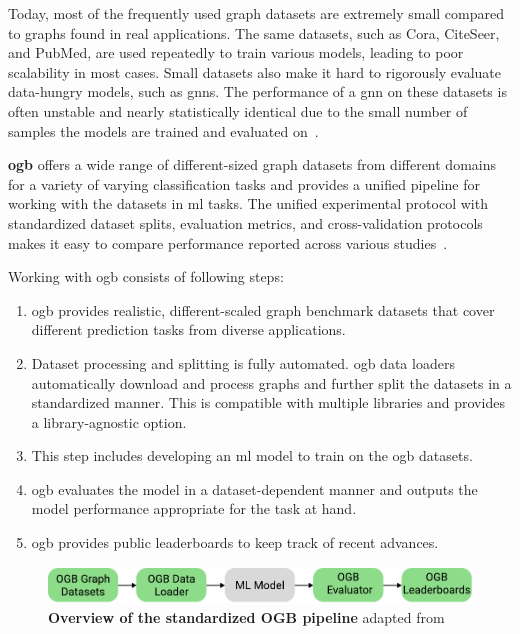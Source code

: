 Today, most of the frequently used graph datasets are extremely small compared to graphs found in real applications.
The same datasets, such as Cora, CiteSeer, and PubMed, are used repeatedly to train various models, leading to poor scalability in most cases. Small datasets also make it hard to rigorously evaluate data-hungry models, such as \acfp{gnn}.
The performance of a \ac{gnn} on these datasets is often unstable and nearly statistically identical due to the small number of samples the models are trained and evaluated on~\cite{Kipf2017,Xu2019, Hu2020}.

\textbf{\Ac{ogb}} offers a wide range of different-sized graph datasets from different domains for a variety of varying classification tasks and provides a unified pipeline for working with the datasets in \ac{ml} tasks.
The unified experimental protocol with standardized dataset splits, evaluation metrics, and cross-validation protocols makes it easy to compare performance reported across various studies~\cite{Hu2020}.

Working with \ac{ogb} consists of following steps:

\begin{enumerate}
    \item \Ac{ogb} provides realistic, different-scaled graph benchmark datasets that cover different prediction tasks from diverse applications.
    \item Dataset processing and splitting is fully automated. \Ac{ogb} data loaders automatically download and process graphs and further split the datasets in a standardized manner.
          This is compatible with multiple libraries and provides a library-agnostic option.
    \item This step includes developing an \ac{ml} model to train on the \ac{ogb} datasets.
    \item  \Ac{ogb} evaluates the model in a dataset-dependent manner and outputs the model performance appropriate for the task at hand.
    \item \Ac{ogb} provides public leaderboards to keep track of recent advances.
\end{enumerate}

\begin{figure}[H]
    \centering
    \includegraphics[width= 0.90\linewidth]{gfx/implementation/OGB_pipeline}
    \caption{\textbf{Overview of the standardized OGB pipeline} adapted from \cite{Hu2020}}\label{fig:implement:pipeline}
\end{figure}

